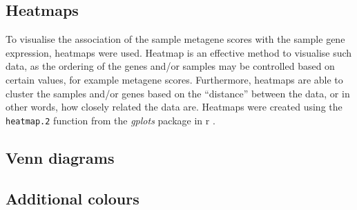 \subsection{Heatmaps}
\label{sub:heatmaps}

To visualise the association of the sample metagene scores with the sample gene expression, heatmaps were used.
Heatmap is an effective method to visualise such data, as the ordering of the genes and/or samples may be controlled based on certain values, for example metagene scores.
Furthermore, heatmaps are able to cluster the samples and/or genes based on the ``distance'' between the data, or in other words, how closely related the data are.
Heatmaps were created using the \texttt{heatmap.2} function from the \textit{gplots} package in \gls{r} \citep{gplots}.

\subsection{Venn diagrams}
\label{sub:venn_diagrams}



\subsection{Additional colours}
\label{sub:additional_colours}























